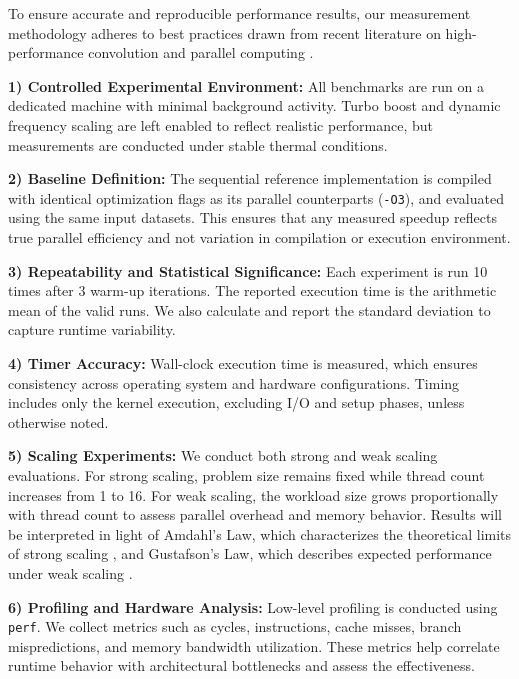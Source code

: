 \documentclass[conference, 10pt]{IEEEtran}
\begin{document}
To ensure accurate and reproducible performance results, our measurement methodology adheres to best practices drawn from recent literature on high-performance convolution and parallel computing \cite{Gawrych2023,  Rajput2013,  Yoon2012}.

\vspace{0.5em}
\textbf{1) Controlled Experimental Environment:} All benchmarks are run on a dedicated machine with minimal background activity. Turbo boost and dynamic frequency scaling are left enabled to reflect realistic performance, but measurements are conducted under stable thermal conditions.

\vspace{0.5em}
\textbf{2) Baseline Definition:} The sequential reference implementation is compiled with identical optimization flags as its parallel counterparts (\texttt{-O3}), and evaluated using the same input datasets. This ensures that any measured speedup reflects true parallel efficiency and not variation in compilation or execution environment.

\vspace{0.5em}
\textbf{3) Repeatability and Statistical Significance:} Each experiment is run 10 times after 3 warm-up iterations. The reported execution time is the arithmetic mean of the valid runs. We also calculate and report the standard deviation to capture runtime variability.

\vspace{0.5em}
\textbf{4) Timer Accuracy:} Wall-clock execution time is measured, which ensures consistency across operating system and hardware configurations. Timing includes only the kernel execution, excluding I/O and setup phases, unless otherwise noted.

\vspace{0.5em}
\textbf{5) Scaling Experiments:} 
We conduct both strong and weak scaling evaluations. For strong scaling, problem size remains fixed while thread count increases from 1 to 16. For weak scaling, the workload size grows proportionally with thread count to assess parallel overhead and memory behavior. Results will be interpreted in light of Amdahl’s Law, which characterizes the theoretical limits of strong scaling \cite{hager2021hpc}, and Gustafson’s Law, which describes expected performance under weak scaling \cite{Gustafson1988}.


\vspace{0.5em}
\textbf{6) Profiling and Hardware Analysis:} Low-level profiling is conducted using \texttt{perf}. We collect metrics such as cycles, instructions, cache misses, branch mispredictions, and memory bandwidth utilization. These metrics help correlate runtime behavior with architectural bottlenecks and assess the effectiveness.
\end{document}
